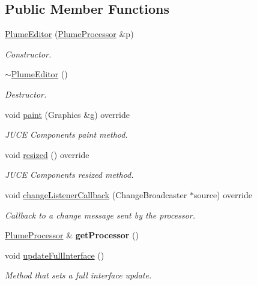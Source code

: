 \subsection*{Public Member Functions}
\begin{DoxyCompactItemize}
\item 
\mbox{\hyperlink{class_plume_editor_a0b9b4a952769836ca43c49ed020951f9}{Plume\+Editor}} (\mbox{\hyperlink{class_plume_processor}{Plume\+Processor}} \&p)
\begin{DoxyCompactList}\small\item\em Constructor. \end{DoxyCompactList}\item 
\mbox{\label{class_plume_editor_af16dd852a3419961627d070d62e3e644}} 
\mbox{\hyperlink{class_plume_editor_af16dd852a3419961627d070d62e3e644}{$\sim$\+Plume\+Editor}} ()
\begin{DoxyCompactList}\small\item\em Destructor. \end{DoxyCompactList}\item 
\mbox{\label{class_plume_editor_a3b31e2023faf921f446b132b24a917c0}} 
void \mbox{\hyperlink{class_plume_editor_a3b31e2023faf921f446b132b24a917c0}{paint}} (Graphics \&g) override
\begin{DoxyCompactList}\small\item\em J\+U\+CE Components\textquotesingle{} paint method. \end{DoxyCompactList}\item 
\mbox{\label{class_plume_editor_aa42064f898f3a543173c5b29c7b2932c}} 
void \mbox{\hyperlink{class_plume_editor_aa42064f898f3a543173c5b29c7b2932c}{resized}} () override
\begin{DoxyCompactList}\small\item\em J\+U\+CE Components\textquotesingle{} resized method. \end{DoxyCompactList}\item 
void \mbox{\hyperlink{class_plume_editor_a5d593b33e5e4e33827928dbcdc272416}{change\+Listener\+Callback}} (Change\+Broadcaster $\ast$source) override
\begin{DoxyCompactList}\small\item\em Callback to a change message sent by the processor. \end{DoxyCompactList}\item 
\mbox{\label{class_plume_editor_a3d5df58d658438a09a9823b3a06d101d}} 
\mbox{\hyperlink{class_plume_processor}{Plume\+Processor}} \& {\bfseries get\+Processor} ()
\item 
void \mbox{\hyperlink{class_plume_editor_acddc96d095aeb53f7a4ee6cf1f3265e6}{update\+Full\+Interface}} ()
\begin{DoxyCompactList}\small\item\em Method that sets a full interface update. \end{DoxyCompactList}\end{DoxyCompactItemize}


